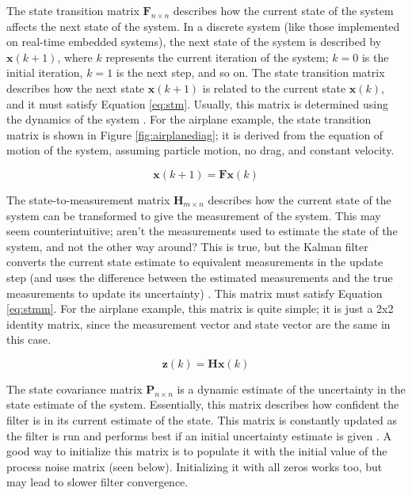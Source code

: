 \documentclass[11pt]{ucthesisCP}
\begin{document}
The state transition matrix \(\mathbf{F}_{n \times n}\) describes how the current state of the system affects the next state of the system. In a discrete system (like those implemented on real-time embedded systems), the next state of the system is described by \(\mathbf{x}(k+1)\), where \(k\) represents the current iteration of the system; \(k=0\) is the initial iteration, \(k=1\) is the next step, and so on. The state transition matrix describes how the next state \(\mathbf{x}(k+1)\) is related to the current state \(\mathbf{x}(k)\), and it must satisfy Equation \ref{eq:stm}. Usually, this matrix is determined using the dynamics of the system \cite{kfsimply}. For the airplane example, the state transition matrix is shown in Figure \ref{fig:airplanediag}; it is derived from the equation of motion of the system, assuming particle motion, no drag, and constant velocity.

\begin{equation} \label{eq:stm}
	\mathbf{x}(k+1) = \mathbf{F} \mathbf{x}(k)
\end{equation}

The state-to-measurement matrix \(\mathbf{H}_{m \times n}\) describes how the current state of the system can be transformed to give the measurement of the system. This may seem counterintuitive; aren’t the measurements used to estimate the state of the system, and not the other way around? This is true, but the Kalman filter converts the current state estimate to equivalent measurements in the update step (and uses the difference between the estimated measurements and the true measurements to update its uncertainty) \cite{kfsimply}. This matrix must satisfy Equation \ref{eq:stmm}. For the airplane example, this matrix is quite simple; it is just a 2x2 identity matrix, since the measurement vector and state vector are the same in this case.

\begin{equation} \label{eq:stmm}
	\mathbf{z}(k) = \mathbf{H} \mathbf{x}(k)
\end{equation}

The state covariance matrix \(\mathbf{P}_{n \times n}\) is a dynamic estimate of the uncertainty in the state estimate of the system. Essentially, this matrix describes how confident the filter is in its current estimate of the state. This matrix is constantly updated as the filter is run and performs best if an initial uncertainty estimate is given \cite{kfsimply}. A good way to initialize this matrix is to populate it with the initial value of the process noise matrix (seen below). Initializing it with all zeros works too, but may lead to slower filter convergence.
\end{document}
